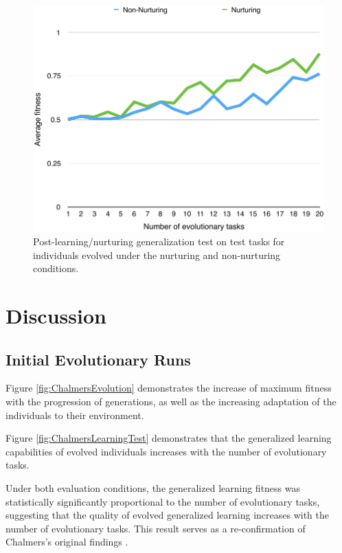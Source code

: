 \documentclass[master]{outhesis}
\begin{document}
\begin{figure}[H]
	\centering
	\includegraphics{NurturingGeneralizationTestPlot.pdf}
	\caption{Post-learning/nurturing generalization test on test tasks for individuals evolved under the nurturing and non-nurturing conditions.}
\end{figure}

\chapter{Discussion}

\section{Initial Evolutionary Runs}

Figure \ref{fig:ChalmersEvolution} demonstrates the increase of maximum fitness with the progression of generations,
as well as the increasing adaptation of the individuals to their environment.

Figure \ref{fig:ChalmersLearningTest} demonstrates that the generalized learning capabilities of evolved individuals increases with the number of evolutionary tasks.

Under both evaluation conditions, the generalized learning fitness was statistically significantly proportional to the number of evolutionary tasks, suggesting that the quality of evolved generalized learning increases with the number of evolutionary tasks.
This result serves as a re-confirmation of Chalmers's original findings \cite{chalmers-evolution-learning}.
\end{document}
